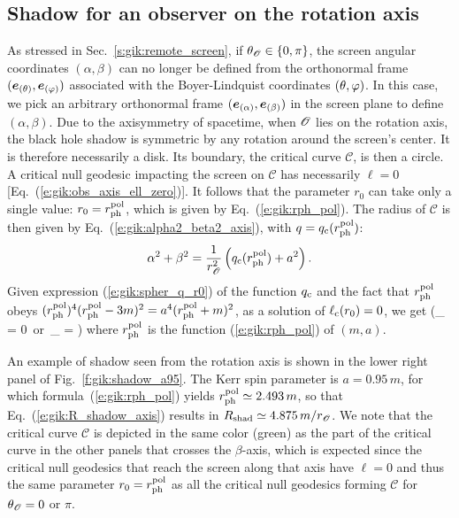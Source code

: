 \subsection{Shadow for an observer on the rotation axis} \label{s:gik:shadow_rot_axis}

As stressed in Sec.~\ref{s:gik:remote_screen}, if $\theta_{\mathscr{O}}\in\{0,\pi\}$,
the screen angular coordinates $(\alpha,\beta)$ can no longer be defined from the
orthonormal frame
$(\bm{e}_{(\theta)}, \bm{e}_{(\varphi)})$ associated with the Boyer-Lindquist coordinates $(\theta,\varphi)$.
In this case, we pick an arbitrary orthonormal
frame $(\bm{e}_{(\alpha)}, \bm{e}_{(\beta)})$ in the screen plane to define
$(\alpha,\beta)$.
Due to the axisymmetry of spacetime, when $\mathscr{O}$ lies on the rotation axis, the black hole
shadow is symmetric by any rotation around the screen's center. It
is therefore necessarily a disk. Its boundary, the critical curve $\mathscr{C}$,
is then a circle.
A critical null geodesic impacting the screen on $\mathscr{C}$
has necessarily $\ell=0$ [Eq.~(\ref{e:gik:obs_axis_ell_zero})]. It follows
that the parameter $r_0$ can take only a single value:
$r_0 = r_{\rm ph}^{\rm pol}$, which is
given by Eq.~(\ref{e:gik:rph_pol}). The radius of $\mathscr{C}$ is
then given by Eq.~(\ref{e:gik:alpha2_beta2_axis}), with $q=q_{\rm c}(r_{\rm ph}^{\rm pol})$:
\[
    \alpha^2 + \beta^2 = \frac{1}{r_{\mathscr{O}}^2} \left( q_{\rm c}(r_{\rm ph}^{\rm pol}) + a^2\right) .
\]
Given expression (\ref{e:gik:spher_q_r0}) of the function $q_{\rm c}$
and the fact that $r_{\rm ph}^{\rm pol}$ obeys
$(r_{\rm ph}^{\rm pol})^4 (r_{\rm ph}^{\rm pol} - 3m)^2 = a^4 (r_{\rm ph}^{\rm pol} + m)^2$,
as a solution of $\ell_{\rm c}(r_0) = 0$, we get
\be \label{e:gik:R_shadow_axis}
    \qquad (\th_{\Obs} = 0\ \mbox{or}\  \th_{\Obs} = \pi)
\ee
where $r_{\rm ph}^{\rm pol}$ is the function (\ref{e:gik:rph_pol}) of $(m, a)$.

\begin{example}
An example of shadow seen from the rotation axis is shown in the lower right panel of
Fig.~\ref{f:gik:shadow_a95}. The Kerr spin parameter is $a=0.95\, m$, for which
formula~(\ref{e:gik:rph_pol})
yields $r_{\rm ph}^{\rm pol} \simeq 2.493\, m$,
so that Eq.~(\ref{e:gik:R_shadow_axis}) results in
$R_{\rm shad} \simeq 4.875\, m / r_{\mathscr{O}}$.
We note that the critical curve $\mathscr{C}$ is depicted in the same color (green)
as the part of the critical curve in the other panels that crosses the $\beta$-axis,
which is expected since the critical null geodesics that reach the screen along
that axis have $\ell=0$ and thus the same parameter $r_0 = r_{\rm ph}^{\rm pol}$
as all the critical null geodesics forming $\mathscr{C}$ for $\theta_{\mathscr{O}} = 0$
or $\pi$.
\end{example}

